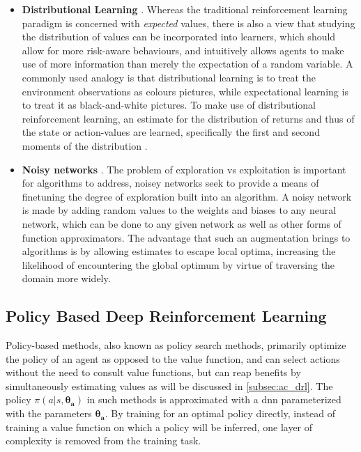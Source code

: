 \documentclass[../report.tex]{subfiles}
\begin{document}
\begin{itemize}
    \item \textbf{Distributional Learning} \cite{distributional_rl_1, distributional_rl_2}. Whereas the traditional reinforcement learning paradigm is concerned with \textit{expected} values, there is also a view that studying the distribution of values can be incorporated into learners, which should allow for more risk-aware behaviours, and intuitively allows agents to make use of more information than merely the expectation of a random variable. A commonly used analogy is that distributional learning is to treat the environment observations as colours pictures, while expectational learning is to treat it as black-and-white pictures. To make use of distributional reinforcement learning, an estimate for the distribution of returns and thus of the state or action-values are learned, specifically the first and second moments of the distribution \cite{distributional_rl_1}.
    \item \textbf{Noisy networks} \cite{noisy_networks}. The problem of exploration vs exploitation is important for algorithms to address, noisey networks seek to provide a means of finetuning the degree of exploration built into an algorithm. A noisy network is made by adding random values to the weights and biases to any neural network, which can be done to any given network as well as other forms of function approximators. The advantage that such an augmentation brings to algorithms is by allowing estimates to escape local optima, increasing the likelihood of encountering the global optimum by virtue of traversing the domain more widely.
\end{itemize}


\subsection{Policy Based Deep Reinforcement Learning}\label{subsec:policy_based_drl}
Policy-based methods, also known as policy search methods, primarily optimize the policy of an agent as opposed to the value function, and can select actions without the need to consult value functions, but can reap benefits by simultaneously estimating values as will be discussed in \autoref{subsec:ac_drl}. The policy $\pi(a|s,\boldsymbol{\theta_a})$ in such methods is approximated with a \ac{dnn} parameterized with the parameters $\boldsymbol{\theta_a}$. By training for an optimal policy directly, instead of training a value function on which a policy will be inferred, one layer of complexity is removed from the training task.
\end{document}
